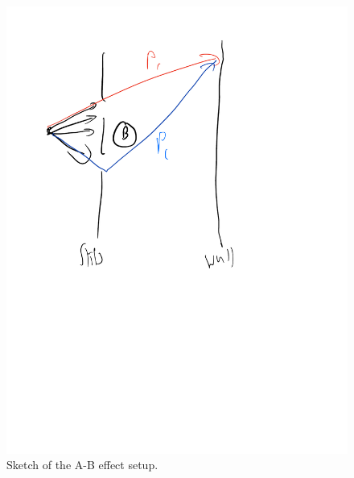\begin{figure}[htbp]
    \centering
    \includegraphics[scale=0.5]{Images/fig-ABeffect.pdf}
    \caption{Sketch of the A-B effect setup.}
    \label{fig-ABeffect}
\end{figure}

